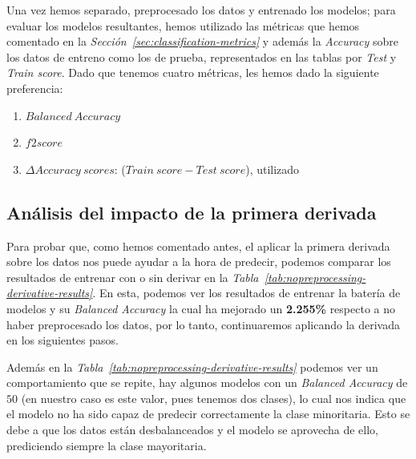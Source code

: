 Una vez hemos separado, preprocesado los datos y entrenado los modelos; para evaluar los modelos resultantes, hemos utilizado las métricas que hemos comentado en la \textit{Sección\ \ref*{sec:classification-metrics}} y además la \textit{Accuracy} sobre los datos de entreno como los de prueba, representados en las tablas por \textit{Test} y \textit{Train score}.
Dado que tenemos cuatro métricas, les hemos dado la siguiente preferencia:
\begin{enumerate}
    \item $Balanced\ Accuracy$
    \item $f2score$
    \item $\Delta Accuracy\ scores$: ($Train\ score-Test\ score$), utilizado 
\end{enumerate}


\subsection{Análisis del impacto de la primera derivada}

Para probar que, como hemos comentado antes, el aplicar la primera derivada sobre los datos nos puede ayudar a la hora de predecir, podemos comparar los resultados de entrenar con o sin derivar en la \textit{Tabla\ \ref{tab:nopreprocessing-derivative-results}}. En esta, podemos ver los resultados de entrenar la batería de modelos y su \textit{Balanced Accuracy} la cual ha mejorado un \textbf{2.255\%} respecto a no haber preprocesado los datos, por lo tanto, continuaremos aplicando la derivada en los siguientes pasos.

Además en la \textit{Tabla\ \ref{tab:nopreprocessing-derivative-results}} podemos ver un comportamiento que se repite, hay algunos modelos con un \textit{Balanced Accuracy} de $50$ (en nuestro caso es este valor, pues tenemos dos clases), lo cual nos indica que el modelo no ha sido capaz de predecir correctamente la clase minoritaria. Esto se debe a que los datos están desbalanceados y el modelo se aprovecha de ello, prediciendo siempre la clase mayoritaria.


